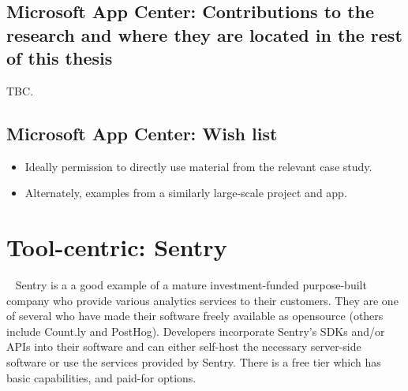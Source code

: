 \subsection{Microsoft App Center: Contributions to the research and where they are located in the rest of this thesis}
TBC.

\subsection*{Microsoft App Center: Wish list}
{\small
\begin{itemize}
    \item Ideally permission to directly use material from the relevant case study.
    \item Alternately, examples from a similarly large-scale project and app.
\end{itemize}
}
\clearpage


\section{Tool-centric: Sentry}~\label{case-study-overview-sentry}
Sentry is a a good example of a mature investment-funded purpose-built company who provide various analytics services to their customers. They are one of several who have made their software freely available as opensource (others include Count.ly and PostHog). Developers incorporate Sentry's SDKs and/or APIs into their software and can either self-host the necessary server-side software or use the services provided by Sentry. There is a free tier which has basic capabilities, and paid-for options.

